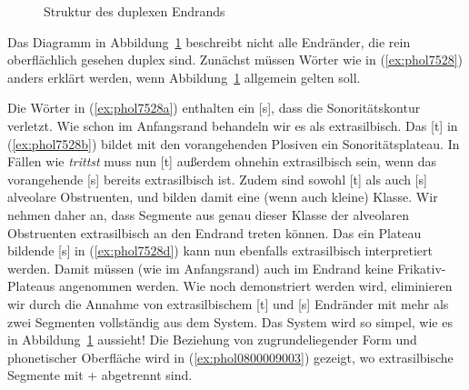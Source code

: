 \begin{figure}
  \caption{Struktur des duplexen Endrands}
  \label{fig:endranduplex}
\end{figure}

Das Diagramm in Abbildung~\ref{fig:endranduplex} beschreibt nicht alle Endränder, die rein oberflächlich gesehen duplex sind.
Zunächst müssen Wörter wie in (\ref{ex:phol7528}) anders erklärt werden, wenn Abbildung~\ref{fig:endranduplex} allgemein gelten soll.

\begin{exe}
  \ex \label{ex:phol7528}
  \begin{xlist}
  \end{xlist}
\end{exe}

Die Wörter in (\ref{ex:phol7528a}) enthalten ein [s], dass die Sonoritätskontur verletzt.
Wie schon im Anfangsrand behandeln wir es als extrasilbisch.
Das [t] in (\ref{ex:phol7528b}) bildet mit den vorangehenden Plosiven ein Sonoritätsplateau.
In Fällen wie \textit{trittst} muss nun [t] außerdem ohnehin extrasilbisch sein, wenn das vorangehende [s] bereits extrasilbisch ist.
Zudem sind sowohl [t] als auch [s] alveolare Obstruenten, und bilden damit eine (wenn auch kleine) Klasse.
Wir nehmen daher an, dass Segmente aus genau dieser Klasse der alveolaren Obstruenten extrasilbisch an den Endrand treten können.
Das ein Plateau bildende [s] in (\ref{ex:phol7528d}) kann nun ebenfalls extrasilbisch interpretiert werden.
Damit müssen (wie im Anfangsrand) auch im Endrand keine Frikativ-Plateaus angenommen werden.
Wie noch demonstriert werden wird, eliminieren wir durch die Annahme von extrasilbischem [t] und [s] Endränder mit mehr als zwei Segmenten vollständig aus dem System.
Das System wird so simpel, wie es in Abbildung~\ref{fig:endranduplex} aussieht!
Die Beziehung von zugrundeliegender Form und phonetischer Oberfläche wird in (\ref{ex:phol0800009003}) gezeigt, wo extrasilbische Segmente mit + abgetrennt sind.

